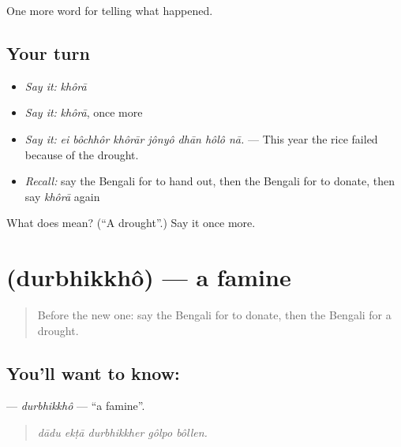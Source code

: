 \begin{grammarlens}[title={What you've built}]
One more word for telling what happened.
\end{grammarlens}

\subsection*{Your turn}
\begin{itemize}
\raggedright
  \item \emph{Say it:} \emph{khôrā}
  \item \emph{Say it:} \emph{khôrā}, once more
  \item \emph{Say it:} \emph{ei bôchhôr khôrār jônyô dhān hôlô nā.} — This year the rice failed because of the drought.
  \item \emph{Recall:} say the Bengali for to hand out, then the Bengali for to donate, then say \emph{khôrā} again
\end{itemize}

\begin{tcolorbox}[breakable,colback=teal!4,colframe=teal!35!black,title={Before you move on}]
What does  mean? (\textquotedblleft{}A drought\textquotedblright{}.) Say it once more.
\end{tcolorbox}
\section[\texorpdfstring{\bn{দুর্ভিক্ষ} (durbhikkhô)}{দুর্ভিক্ষ (durbhikkhô)}]{ (durbhikkhô) — a famine}

\label{lesson:BN-C292-durbhikkho}



\begin{quote}
Before the new one: say the Bengali for to donate, then the Bengali for a drought.
\end{quote}

\subsection*{You'll want to know: }
\textbf{} — \emph{durbhikkhô} — \textquotedblleft{}a famine\textquotedblright{}.

\begin{quote}
    
\end{quote}

\begin{quote}
\emph{dādu ekṭā durbhikkher gôlpo bôllen.}
\end{quote}

